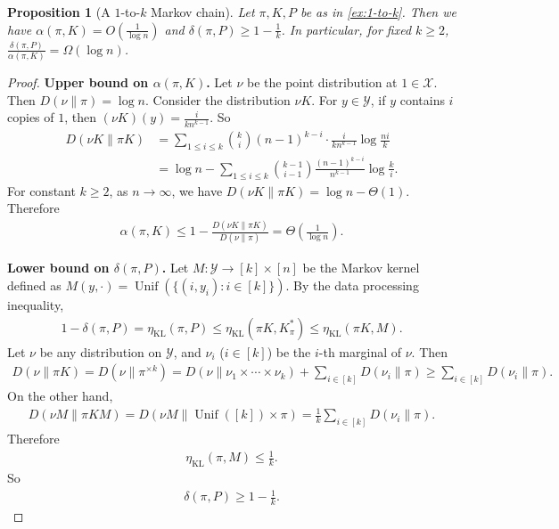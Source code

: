 \documentclass[11pt]{article}
\def\cX{\mathcal{X}}
\def\cY{\mathcal{Y}}
\DeclareMathOperator\Unif{\mathrm{Unif}}
\DeclareMathOperator\KL{\mathrm{KL}}
\newtheorem{proposition}[theorem]{Proposition}
\theoremstyle{definition}
\begin{document}
\begin{proposition}[A $1$-to-$k$ Markov chain] \label{prop:1-to-k}
  Let $\pi, K, P$ be as in \cref{ex:1-to-k}.
  Then we have $\alpha(\pi, K) = O\left(\frac{1}{\log n}\right)$ and $\delta(\pi, P) \ge 1-\frac 1k$.
  In particular, for fixed $k\ge 2$, $\frac{\delta(\pi, P)}{\alpha(\pi, K)} = \Omega(\log n)$.
\end{proposition}
\begin{proof}
  \textbf{Upper bound on $\alpha(\pi, K)$.}
  Let $\nu$ be the point distribution at $1\in \cX$.
  Then $D(\nu \| \pi) = \log n$.
  Consider the distribution $\nu K$.
  For $y\in \cY$, if $y$ contains $i$ copies of $1$, then $(\nu K)(y) = \frac{i}{k n^{k-1}}$.
  So
  \begin{align}
    D(\nu K \| \pi K) &=
    \sum_{1\le i\le k} \binom k i (n-1)^{k-i} \cdot \frac{i}{k n^{k-1}} \log \frac{n i}{k} \\
    \nonumber &= \log n - \sum_{1\le i\le k} \binom {k-1}{i-1} \frac{(n-1)^{k-i}}{n^{k-1}} \log \frac ki.
  \end{align}
  For constant $k\ge 2$, as $n\to \infty$, we have $D(\nu K \| \pi K) = \log n - \Theta(1)$.
  Therefore
  \begin{align} \label{eqn:1-to-k-alpha-upper-bound}
    \alpha(\pi, K) \le 1-\frac{D(\nu K \| \pi K)}{D(\nu \| \pi)} = \Theta\left(\frac{1}{\log n}\right).
  \end{align}

  \textbf{Lower bound on $\delta(\pi, P)$.}
  Let $M: \cY \to [k]\times [n]$ be the Markov kernel defined as $M(y,\cdot) = \Unif(\{(i,y_i) : i\in [k]\})$.
  By the data processing inequality,
  \begin{align}
    1-\delta(\pi, P) = \eta_{\KL}(\pi, P) \le \eta_{\KL}(\pi K, K_\pi^*) \le \eta_{\KL}(\pi K, M).
  \end{align}
  Let $\nu$ be any distribution on $\cY$, and $\nu_i$ ($i\in [k]$) be the $i$-th marginal of $\nu$.
  Then
  \begin{align}
    D(\nu \| \pi K) = D\left(\nu \| \pi^{\times k}\right)
    = D(\nu \| \nu_1 \times \cdots \times \nu_k) + \sum_{i\in [k]} D(\nu_i\| \pi)
    \ge \sum_{i\in [k]} D(\nu_i\| \pi).
  \end{align}
  On the other hand,
  \begin{align}
    D(\nu M \| \pi K M) = D(\nu M \| \Unif([k]) \times \pi) = \frac 1k \sum_{i\in [k]} D(\nu_i \| \pi).
  \end{align}
  Therefore
  \begin{align}
    \eta_{\KL}(\pi, M) \le \frac 1k.
  \end{align}
  So
  \begin{align} \label{eqn:1-to-k-delta-lower-bound}
    \delta(\pi, P) \ge 1-\frac 1k.
  \end{align}
\end{proof}
\end{document}
